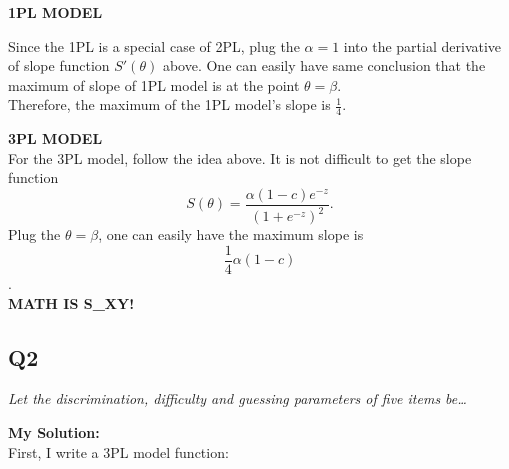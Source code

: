 \documentclass[
]{article}
\begin{document}
\textbf{1PL MODEL}

Since the 1PL is a special case of 2PL, plug the \(\alpha = 1\) into the
partial derivative of slope function \(S'(\theta)\) above. One can
easily have same conclusion that the maximum of slope of 1PL model is at
the point \(\theta = \beta\).\\
Therefore, the maximum of the 1PL model's slope is \(\frac{1}{4}\).

\textbf{3PL MODEL}\\
For the 3PL model, follow the idea above. It is not difficult to get the
slope function \[S(\theta)=\frac{\alpha (1-c) e^{-z}}{(1 + e^{-z})^2}.\]
Plug the \(\theta=\beta\), one can easily have the maximum slope is
\[\frac{1}{4}\alpha(1-c)\].\\
\textbf{MATH IS S\_XY!}

\hypertarget{q2}{%
\subsection{Q2}\label{q2}}

\emph{Let the discrimination, difficulty and guessing parameters of five
items be\ldots{}}

\textbf{My Solution:}\\
First, I write a 3PL model function:
\end{document}

